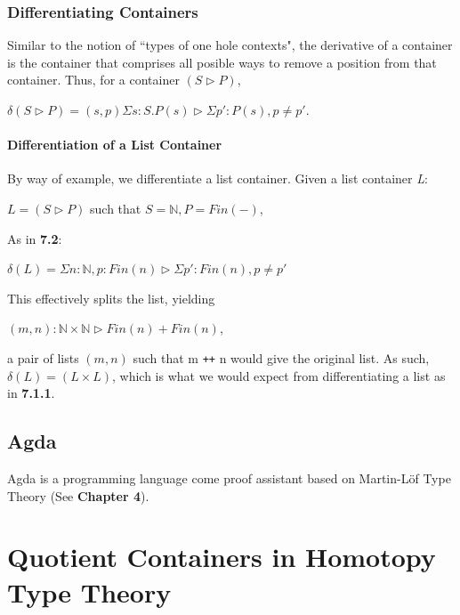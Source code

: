 \documentclass[12pt]{report}
\begin{document}
\section{Differentiating Containers}
Similar to the notion of ``types of one hole contexts", the derivative of a container is the container that comprises all posible ways to remove a position from that container.
\newpage
Thus, for a container $(S \rhd P)$,
\begin{center}
$\delta (S \rhd P) = (s,p) \Sigma s : S . P(s) \rhd \Sigma p':P(s),p \neq p'$.
\end{center}



\subsection{Differentiation of a List Container}
By way of example, we differentiate a list container. Given a list container \textit{L}:
\begin{center}
$L = (S \rhd P)$ such that $S = \mathbb{N}, P = Fin(-)$,
\end{center}
As in \textbf{7.2}:
\begin{center}
$\delta(L) = \Sigma n : \mathbb{N}, p: Fin(n) \rhd \Sigma p' : Fin(n), p \neq p'$
\end{center} 
This effectively splits the list, yielding
\begin{center}
$(m,n): \mathbb{N} \times \mathbb{N} \rhd Fin(n) + Fin(n)$,
\end{center}
a pair of lists $(m,n)$ such that m \texttt{++} n would give the original list. As such, $\delta(L) = (L \times L)$, which is what we would expect from differentiating a list as in \textbf{7.1.1}.



\chapter{Agda}
Agda is a programming language come proof assistant based on Martin-L\"of Type Theory (See \textbf{Chapter 4}).







\part{Quotient Containers in Homotopy Type Theory}
\end{document}
